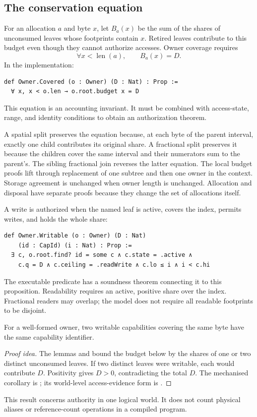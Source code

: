 \documentclass[a4paper,UKenglish,cleveref]{lipics-v2021}
\begin{document}
\subsection{The conservation equation}

For an allocation $a$ and byte $x$, let $B_a(x)$ be the sum of the shares of
unconsumed leaves whose footprints contain $x$. Retired leaves contribute to
this budget even though they cannot authorize accesses. Owner coverage requires
\[
  \forall x < \operatorname{len}(a),\qquad B_a(x)=D.
\]
In the implementation:
\begin{lstlisting}
def Owner.Covered (o : Owner) (D : Nat) : Prop :=
  ∀ x, x < o.len → o.root.budget x = D
\end{lstlisting}
This equation is an accounting invariant. It must be combined with access-state,
range, and identity conditions to obtain an authorization theorem.

A spatial split preserves the equation because, at each byte of the parent
interval, exactly one child contributes its original share. A fractional split
preserves it because the children cover the same interval and their numerators
sum to the parent's. The sibling fractional join reverses the latter equation.
The local budget proofs lift through replacement of one subtree and then one
owner in the context. Storage agreement is unchanged when owner length is
unchanged. Allocation and disposal have separate proofs because they change the
set of allocations itself.

A write is authorized when the named leaf is active, covers the index, permits
writes, and holds the whole share:
\begin{lstlisting}
def Owner.Writable (o : Owner) (D : Nat)
    (id : CapId) (i : Nat) : Prop :=
  ∃ c, o.root.find? id = some c ∧ c.state = .active ∧
    c.q = D ∧ c.ceiling = .readWrite ∧ c.lo ≤ i ∧ i < c.hi
\end{lstlisting}
The executable predicate  has a soundness theorem connecting it
to this proposition. Readability requires an active, positive share over the
index. Fractional readers may overlap; the model does not require all readable
footprints to be disjoint.

\begin{theorem}
For a well-formed owner, two writable capabilities covering the same byte have
the same capability identifier.
\end{theorem}
\begin{proof}[Proof idea]
The lemmas  and
 bound the budget below by the shares of one or
two distinct unconsumed leaves. If two distinct leaves were writable, each
would contribute $D$. Positivity gives $D>0$, contradicting the total $D$.
The mechanised corollary is ; its world-level
access-evidence form is .
\end{proof}
This result concerns authority in one logical world. It does not count physical
aliases or reference-count operations in a compiled program.
\end{document}
